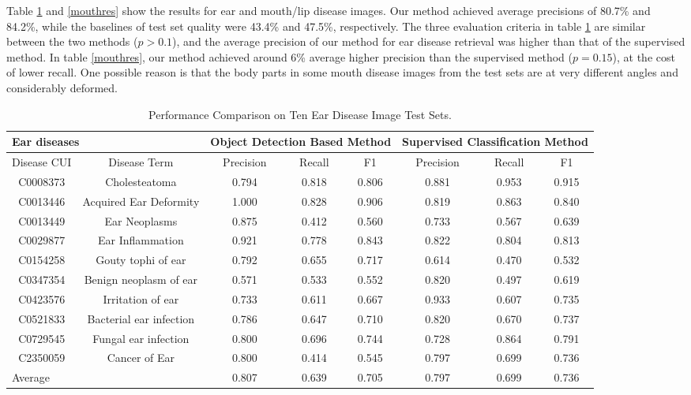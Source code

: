 Table {\ref{earres}} and {\ref{mouthres}} show the results for ear and mouth/lip disease images. Our method achieved average precisions of
80.7\% and 84.2\%, while the baselines of test set quality were
43.4\% and 47.5\%, respectively. The three evaluation criteria in
table {\ref{earres}} are similar between the two methods ($p>0.1$), and the
average precision of our method for ear disease retrieval was
higher than that of the supervised method. In table \ref{mouthres}, our
method achieved around 6\% average higher precision than the
supervised method ($p=0.15$), at the cost of lower recall. One
possible reason is that the body parts in some mouth disease
images from the test sets are at very different angles and considerably
deformed.
\setlength{\tabcolsep}{5.7pt}
\begin{table}
\centering
\caption{Performance Comparison on Ten Ear Disease Image Test Sets.}\label{earres}
\renewcommand{\arraystretch}{1.3}
\begin{tabular}{cccccccc}
\hline
\multicolumn{2}{l}{Ear diseases} & \multicolumn{3}{l}{Object Detection Based Method} &
\multicolumn{3}{l}{Supervised Classification Method} \\ \hline
Disease CUI    &Disease Term & Precision & Recall & F1    & Precision & Recall & F1 \\ \hline
C0008373	&Cholesteatoma&	0.794	&0.818&	0.806&	0.881&	0.953&	0.915\\ \hline
C0013446	&Acquired Ear Deformity&	1.000&	0.828&	0.906&	0.819&	0.863&	0.840\\ \hline
C0013449	&Ear Neoplasms	&0.875	&0.412&	0.560&	0.733	&0.567&	0.639\\ \hline
C0029877	&Ear Inflammation	&0.921&	0.778	&0.843	&0.822	&0.804	&0.813\\ \hline
C0154258	&Gouty tophi of ear	&0.792	&0.655&	0.717&	0.614	&0.470&	0.532\\ \hline
C0347354	&Benign neoplasm of ear	&0.571	&0.533&	0.552&	0.820	&0.497&	0.619\\ \hline
C0423576	&Irritation of ear	&0.733	&0.611	&0.667	&0.933	&0.607	&0.735\\ \hline
C0521833	&Bacterial ear infection&	0.786	&0.647&	0.710&	0.820	&0.670&	0.737\\ \hline
C0729545	&Fungal ear infection	&0.800	&0.696	&0.744&	0.728	&0.864	&0.791\\ \hline
C2350059	&Cancer of Ear&	0.800	&0.414&	0.545&	0.797	&0.699&	0.736\\ \hline
\multicolumn{2}{l}{Average}&0.807&	0.639	&0.705&	0.797	&0.699&	0.736\\ \hline
\end{tabular}
\end{table}

